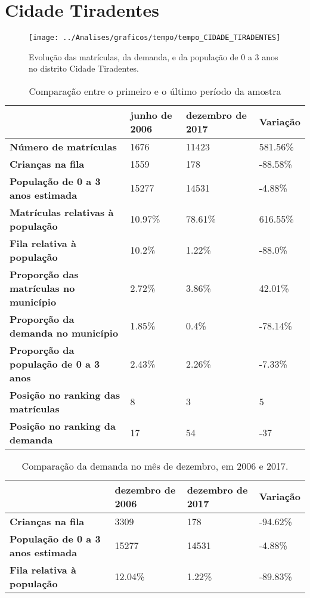 \section{Cidade Tiradentes}
\begin{figure}[H]
\centering
\texttt{[image: ../Analises/graficos/tempo/tempo\_CIDADE\_TIRADENTES]}
\caption{Evolução das matrículas, da demanda, e da população de 0 a 3 anos no distrito Cidade Tiradentes.}
\end{figure}
\begin{table}[H]
\begin{tabular}{|l|l|l|l|}
\hline
\textbf{}                                      & \textbf{junho de 2006}       & \textbf{dezembro de 2017}    & \textbf{Variação} \\ \hline
\textbf{Número de matrículas}                  & 1676 & 11423 & 581.56\% \\ \hline
\textbf{Crianças na fila}                      & 1559 & 178 & -88.58\% \\ \hline
\textbf{População de 0 a 3 anos estimada}      & 15277 & 14531 & -4.88\% \\ \hline
\textbf{Matrículas relativas à população}      & 10.97\% & 78.61\% & 616.55\% \\ \hline
\textbf{Fila relativa à população}             & 10.2\% & 1.22\% & -88.0\% \\ \hline
\textbf{Proporção das matrículas no município} & 2.72\% & 3.86\% & 42.01\% \\ \hline
\textbf{Proporção da demanda no município}     & 1.85\% & 0.4\% & -78.14\% \\ \hline
\textbf{Proporção da população de 0 a 3 anos}  & 2.43\% & 2.26\% & -7.33\% \\ \hline
\textbf{Posição no ranking das matrículas}     & 8 & 3 & 5 \\ \hline
\textbf{Posição no ranking da demanda}         & 17 & 54 & -37 \\ \hline
\end{tabular}
\caption{Comparação entre o primeiro e o último período da amostra}
\end{table}
\begin{table}[H]
\begin{tabular}{|l|l|l|l|}
\hline
\textbf{}                                 & \textbf{dezembro de 2006} & \textbf{dezembro de 2017} & \textbf{Variação} \\ \hline
\textbf{Crianças na fila}                      & 3309 & 178 & -94.62\% \\ \hline
\textbf{População de 0 a 3 anos estimada}      & 15277 & 14531 & -4.88\% \\ \hline
\textbf{Fila relativa à população}             & 12.04\% & 1.22\% & -89.83\% \\ \hline
\end{tabular}
\caption{Comparação da demanda no mês de dezembro, em 2006 e 2017.}
\end{table}

